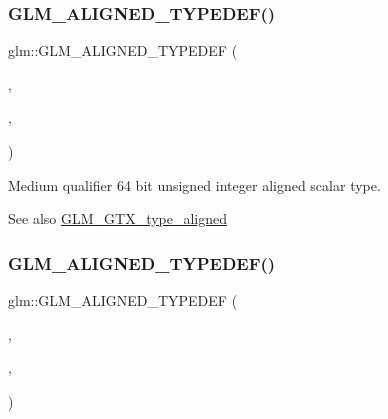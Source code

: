 \subsubsection{\texorpdfstring{G\+L\+M\+\_\+\+A\+L\+I\+G\+N\+E\+D\+\_\+\+T\+Y\+P\+E\+D\+E\+F()}{GLM\_ALIGNED\_TYPEDEF()}\hspace{0.1cm}{\footnotesize\ttfamily [88/209]}}
{\footnotesize\ttfamily glm\+::\+G\+L\+M\+\_\+\+A\+L\+I\+G\+N\+E\+D\+\_\+\+T\+Y\+P\+E\+D\+EF (\begin{DoxyParamCaption}\item[{\hyperlink{group__gtc__type__precision_gaa97354d3120a6dc029a5e9563723de18}{mediump\+\_\+uint64\+\_\+t}}]{,  }\item[{aligned\+\_\+mediump\+\_\+uint64\+\_\+t}]{,  }\item[{8}]{ }\end{DoxyParamCaption})}

Medium qualifier 64 bit unsigned integer aligned scalar type. \begin{DoxySeeAlso}{See also}
\hyperlink{group__gtx__type__aligned}{G\+L\+M\+\_\+\+G\+T\+X\+\_\+type\+\_\+aligned} 
\end{DoxySeeAlso}
\mbox{\label{group__gtx__type__aligned_gada8b996eb6526dc1ead813bd49539d1b}} 
\subsubsection{\texorpdfstring{G\+L\+M\+\_\+\+A\+L\+I\+G\+N\+E\+D\+\_\+\+T\+Y\+P\+E\+D\+E\+F()}{GLM\_ALIGNED\_TYPEDEF()}\hspace{0.1cm}{\footnotesize\ttfamily [89/209]}}
{\footnotesize\ttfamily glm\+::\+G\+L\+M\+\_\+\+A\+L\+I\+G\+N\+E\+D\+\_\+\+T\+Y\+P\+E\+D\+EF (\begin{DoxyParamCaption}\item[{\hyperlink{group__gtc__type__precision_gac04b372784392e82bd557f300c4de097}{mediump\+\_\+u8}}]{,  }\item[{aligned\+\_\+mediump\+\_\+u8}]{,  }\item[{1}]{ }\end{DoxyParamCaption})}

